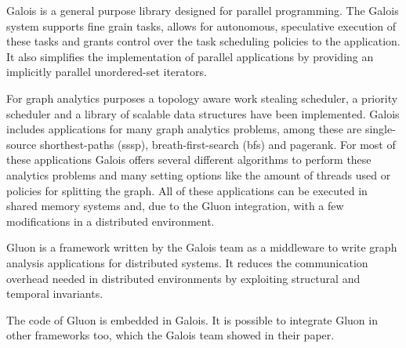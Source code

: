 
Galois\cite{Galois} is a general purpose library designed for parallel programming. The Galois system supports fine grain tasks, allows for autonomous, speculative execution of these tasks and grants control over the task scheduling policies to the application. It also simplifies the implementation of parallel applications by providing an implicitly parallel unordered-set iterators.

For graph analytics purposes a topology aware work stealing scheduler, a priority scheduler and a library of scalable data structures have been implemented. Galois includes applications for many graph analytics problems, among these are single-source shorthest-paths (sssp), breath-first-search (bfs) and pagerank. For most of these applications Galois offers several different algorithms to perform these analytics problems and many setting options like the amount of threads used or policies for splitting the graph. All of these applications can be executed in shared memory systems and, due to the Gluon integration, with a few modifications in a distributed environment.

Gluon\cite{vertGalois} is a framework written by the Galois team as a middleware to write graph analysis applications for distributed systems. It reduces the communication overhead needed in distributed environments by exploiting structural and temporal invariants.

The code of Gluon is embedded in Galois. It is possible to integrate Gluon in other frameworks too, which the Galois team showed in their paper\cite{vertGalois}.

